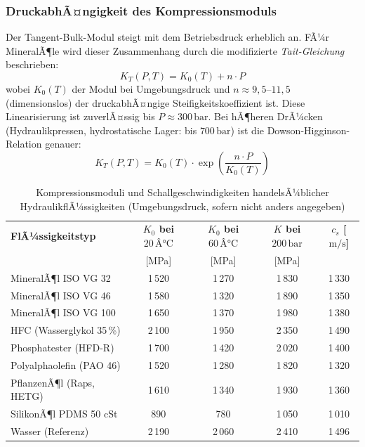 ﻿\documentclass[a4paper,12pt]{scrreprt}
\theoremstyle{definition}
\begin{document}
\subsubsection{DruckabhÃ¤ngigkeit des Kompressionsmoduls}

Der Tangent-Bulk-Modul steigt mit dem Betriebsdruck erheblich an. FÃ¼r
MineralÃ¶le wird dieser Zusammenhang durch die modifizierte
\emph{Tait-Gleichung} beschrieben:
\begin{equation}
  K_T(P, T) = K_0(T) + n \cdot P
  \label{eq:tait_linear}
\end{equation}
wobei $K_0(T)$ der Modul bei Umgebungsdruck und $n \approx 9{,}5$--$11{,}5$
(dimensionslos) der druckabhÃ¤ngige Steifigkeitskoeffizient ist. Diese
Linearisierung ist zuverlÃ¤ssig bis $P \approx 300\,\mathrm{bar}$. Bei hÃ¶heren
DrÃ¼cken (Hydraulikpressen, hydrostatische Lager: bis $700\,\mathrm{bar}$)
ist die Dowson-Higginson-Relation genauer:
\begin{equation}
  K_T(P, T) = K_0(T) \cdot \exp\!\left(\frac{n \cdot P}{K_0(T)}\right)
  \label{eq:dowson_higginson}
\end{equation}

\begin{table}[H]
  \centering
  \caption{Kompressionsmoduli und Schallgeschwindigkeiten handelsÃ¼blicher
    HydraulikflÃ¼ssigkeiten (Umgebungsdruck, sofern nicht anders angegeben)}
  \label{tab:bulk_moduli}
  \begin{tabular}{lcccc}
    \toprule
    \textbf{FlÃ¼ssigkeitstyp}
      & \textbf{$K_0$ bei $20\,Â°\mathrm{C}$}
      & \textbf{$K_0$ bei $60\,Â°\mathrm{C}$}
      & \textbf{$K$ bei $200\,\mathrm{bar}$}
      & \textbf{$c_s$ [$\mathrm{m/s}$]} \\
      & [MPa] & [MPa] & [MPa] & \\
    \midrule
    MineralÃ¶l ISO VG 32        & 1\,520 & 1\,270 & 1\,830 & 1\,330 \\
    MineralÃ¶l ISO VG 46        & 1\,580 & 1\,320 & 1\,890 & 1\,350 \\
    MineralÃ¶l ISO VG 100       & 1\,650 & 1\,370 & 1\,980 & 1\,380 \\
    HFC (Wasserglykol 35\,\%)  & 2\,100 & 1\,950 & 2\,350 & 1\,490 \\
    Phosphatester (HFD-R)      & 1\,700 & 1\,420 & 2\,020 & 1\,400 \\
    Polyalphaolefin (PAO 46)   & 1\,520 & 1\,280 & 1\,820 & 1\,320 \\
    PflanzenÃ¶l (Raps, HETG)    & 1\,610 & 1\,340 & 1\,930 & 1\,360 \\
    SilikonÃ¶l PDMS 50 cSt      &   890  &   780  & 1\,050 & 1\,010 \\
    Wasser (Referenz)          & 2\,190 & 2\,060 & 2\,410 & 1\,496 \\
    \bottomrule
  \end{tabular}
\end{table}
\end{document}

